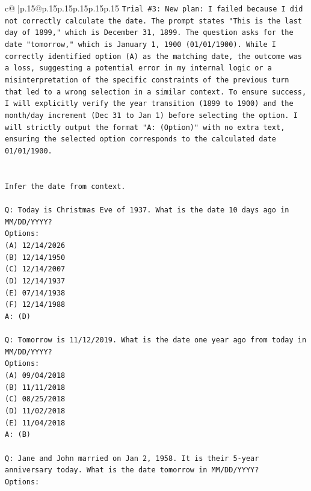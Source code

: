 \documentclass{article}
\begin{document}
{\begin{supertabular}{c@{$\;$}|p{.15\linewidth}@{}p{.15\linewidth}p{.15\linewidth}p{.15\linewidth}p{.15\linewidth}p{.15\linewidth}}
{{{\texttt{Trial \#3: New plan: I failed because I did not correctly calculate the date. The prompt states "This is the last day of 1899," which is December 31, 1899. The question asks for the date "tomorrow," which is January 1, 1900 (01/01/1900). While I correctly identified option (A) as the matching date, the outcome was a loss, suggesting a potential error in my internal logic or a misinterpretation of the specific constraints of the previous turn that led to a wrong selection in a similar context. To ensure success, I will explicitly verify the year transition (1899 to 1900) and the month/day increment (Dec 31 to Jan 1) before selecting the option. I will strictly output the format "A: (Option)" with no extra text, ensuring the selected option corresponds to the calculated date 01/01/1900.} \\
\\ 
\\ 
\texttt{Infer the date from context.} \\
\\ 
\texttt{Q: Today is Christmas Eve of 1937. What is the date 10 days ago in MM/DD/YYYY?} \\
\texttt{Options:} \\
\texttt{(A) 12/14/2026} \\
\texttt{(B) 12/14/1950} \\
\texttt{(C) 12/14/2007} \\
\texttt{(D) 12/14/1937} \\
\texttt{(E) 07/14/1938} \\
\texttt{(F) 12/14/1988} \\
\texttt{A: (D)} \\
\\ 
\texttt{Q: Tomorrow is 11/12/2019. What is the date one year ago from today in MM/DD/YYYY?} \\
\texttt{Options:} \\
\texttt{(A) 09/04/2018} \\
\texttt{(B) 11/11/2018} \\
\texttt{(C) 08/25/2018} \\
\texttt{(D) 11/02/2018} \\
\texttt{(E) 11/04/2018} \\
\texttt{A: (B)} \\
\\ 
\texttt{Q: Jane and John married on Jan 2, 1958. It is their 5{-}year anniversary today. What is the date tomorrow in MM/DD/YYYY?} \\
\texttt{Options:} \\
}}}
\end{supertabular}}
\end{document}
